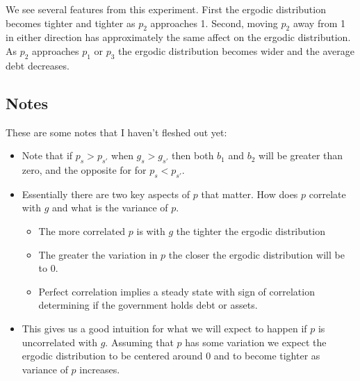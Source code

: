 \documentclass[12pt]{article}
\begin{document}
We see several features from this experiment.  First the ergodic distribution becomes tighter and tighter as $p_2$ approaches 1.  Second, moving $p_2$ away from 1 in either direction has approximately the same affect on the ergodic distribution.  As $p_2$ approaches $p_1$ or $p_3$ the ergodic distribution becomes wider and the average debt decreases.
\subsection{Notes}These are some notes that I haven't fleshed out yet:
\begin{itemize}
	\item  Note that if $p_s > p_{s'}$ when $g_s > g_{s'}$ then both $b_1$ and $b_2$ will be greater than zero, and the opposite for for $p_s < p_{s'}$.
	\item  Essentially there are two key aspects of $p$ that matter.  How does $p$ correlate with $g$ and what is the variance of $p$.  
	\begin{itemize}
	\item The more correlated $p$ is with $g$ the tighter the ergodic distribution
	\item  The greater the variation  in $p$ the closer the ergodic distribution will be to 0.
	\item  Perfect correlation implies a steady state with sign of correlation determining if the government holds debt or assets.
	\end{itemize}
	\item  This gives us a good intuition for what we will expect to happen if $p$ is uncorrelated with $g$. Assuming that $p$ has some variation we expect the ergodic distribution to be centered around $0$ and to become tighter as variance of $p$ increases.
\end{itemize}
\end{document}
